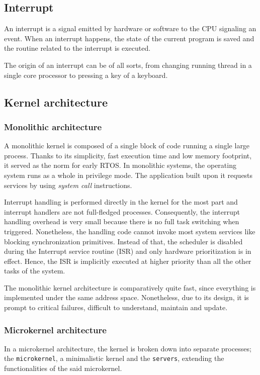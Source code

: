 \subsection{Interrupt}
An interrupt is a signal emitted by hardware or software to the CPU signaling an event.
When an interrupt happens, the state of the current program is saved 
    and the routine related to the interrupt is executed.

The origin of an interrupt can be of all sorts, 
    from changing running thread in a single core processor to pressing a key of a keyboard.

\subsection{Kernel architecture\label{subsect:kernel-arch}}

\subsubsection{Monolithic architecture}
A monolithic kernel is composed of a single block of code running a single large process.
Thanks to its simplicity, fast execution time and low memory footprint, it served as the norm for early RTOS.
In monolithic systems, the operating system runs as a whole in privilege mode.
The application built upon it requests services by using \textit{system call} instructions.

Interrupt handling is performed directly in the kernel for the most part and interrupt handlers are not full-fledged processes.
Consequently, the interrupt handling overhead is very small because there is no full task switching when triggered.
Nonetheless, the handling code cannot invoke most system services like blocking synchronization primitives.
Instead of that, the scheduler is disabled during the Interrupt service routine (ISR) and only hardware prioritization is in effect.
Hence, the ISR is implicitly executed at higher priority than all the other tasks of the system.

The monolithic kernel architecture is comparatively quite fast, since ev\-ery\-thing is implemented under the same address space.
Nonetheless, due to its design, it is prompt to critical failures, difficult to understand, maintain and update\cite{OS_for_iot}\cite{comparison_iot_constrained_devices}.

\subsubsection{Microkernel architecture}
In a microkernel architecture, the kernel is broken down into separate processes;
     the \texttt{microkernel}, a minimalistic kernel
     and the \texttt{servers}, extending the functionalities of the said microkernel\cite{comparison_iot_constrained_devices}.

